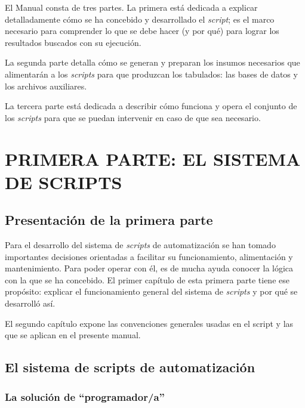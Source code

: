 \documentclass[
  spanish,
]{book}
\begin{document}
El Manual consta de tres partes. La primera está dedicada a explicar detalladamente cómo se ha concebido y desarrollado el \emph{script}; es el marco necesario para comprender lo que se debe hacer (y por qué) para lograr los resultados buscados con su ejecución.

La segunda parte detalla cómo se generan y preparan los insumos necesarios que alimentarán a los \emph{scripts} para que produzcan los tabulados: las bases de datos y los archivos auxiliares.

La tercera parte está dedicada a describir cómo funciona y opera el conjunto de los \emph{scripts} para que se puedan intervenir en caso de que sea necesario.

\hypertarget{part-primera-parte-el-sistema-de-scripts}{%
\part*{PRIMERA PARTE: EL SISTEMA DE SCRIPTS}\label{part-primera-parte-el-sistema-de-scripts}}

\hypertarget{presentaciuxf3n-de-la-primera-parte}{%
\chapter*{Presentación de la primera parte}\label{presentaciuxf3n-de-la-primera-parte}}

Para el desarrollo del sistema de \emph{scripts} de automatización se han tomado importantes decisiones orientadas a facilitar su funcionamiento, alimentación y mantenimiento. Para poder operar con él, es de mucha ayuda conocer la lógica con la que se ha concebido. El primer capítulo de esta primera parte tiene ese propósito: explicar el funcionamiento general del sistema de \emph{scripts} y por qué se desarrolló así.

El segundo capítulo expone las convenciones generales usadas en el script y las que se aplican en el presente manual.

\hypertarget{el-sistema-de-scripts-de-automatizaciuxf3n}{%
\chapter{El sistema de scripts de automatización}\label{el-sistema-de-scripts-de-automatizaciuxf3n}}

\hypertarget{la-soluciuxf3n-de-programadora}{%
\section{La solución de ``programador/a''}\label{la-soluciuxf3n-de-programadora}}
\end{document}
